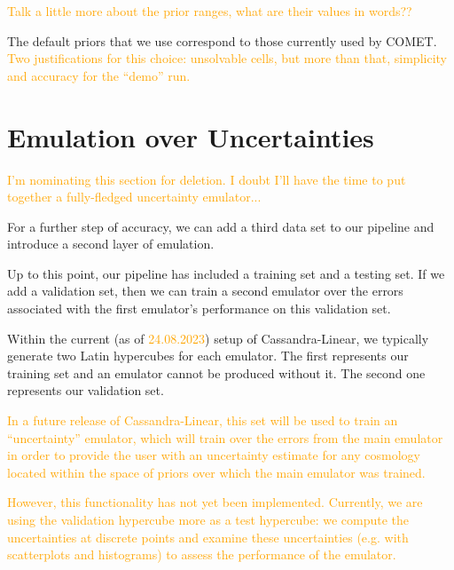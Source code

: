 \textcolor{orange}{Talk a little more about the prior ranges, what are their
values in words??}

The default priors that we use correspond to those currently used by COMET. \textcolor{orange}{Two
justifications for this choice: unsolvable cells, but more than that, simplicity and accuracy
for the ``demo'' run.}

\section{Emulation over Uncertainties}

\textcolor{orange}{I'm nominating this section for deletion. I doubt I'll have
the time to put together a fully-fledged uncertainty emulator...}

For a further step of accuracy, we can add a third data set to our pipeline
and introduce a second layer of emulation.

Up to this point, our pipeline has included a training set and a testing set.
If we add a validation set, then we can train a second emulator over the
errors associated with the first emulator's performance on this validation
set.

Within the current (as of \textcolor{orange}{24.08.2023}) setup of
Cassandra-Linear, we typically generate two Latin hypercubes for each
emulator. The first represents our training set and an emulator cannot be
produced without it. The second one represents our validation set.

\textcolor{orange}{In a future
release of Cassandra-Linear, this set will be used to train an ``uncertainty''
emulator, which will train over the errors from the main emulator in order to
provide the user with an uncertainty estimate for any cosmology located within
the space of priors over which the main emulator was trained.} 

\textcolor{orange}{However, this functionality has not yet been implemented. 
Currently, we are 
using the validation hypercube more as a test hypercube: we compute the uncertainties at discrete points and examine these uncertainties (e.g. with
scatterplots and histograms) to assess the performance of the emulator.}
